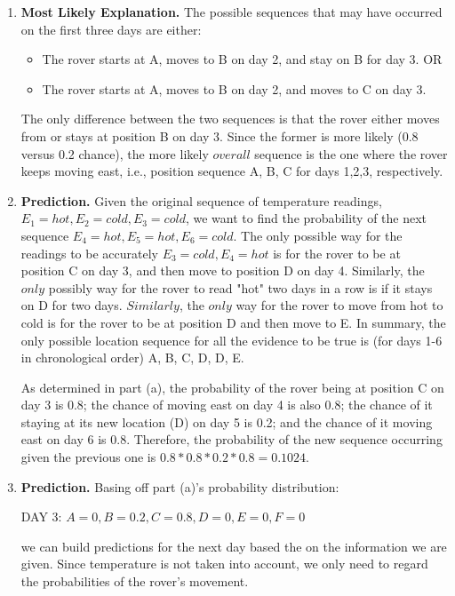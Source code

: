 \documentclass[12pt]{article}
\begin{document}
\begin{enumerate}[label=(\alph*)]
    \item \textbf{Most Likely Explanation.} The possible sequences that may have occurred on the first three days are either:
        \begin{itemize}
            \item The rover starts at A, moves to B on day 2, and stay on B for day 3. OR
            \item The rover starts at A, moves to B on day 2, and moves to C on day 3.
        \end{itemize}
    The only difference between the two sequences is that the rover either moves from or stays at position B on day 3. Since the former is more likely (0.8 versus 0.2 chance), the more likely $overall$ sequence is the one where the rover keeps moving east, i.e., position sequence A, B, C for days 1,2,3, respectively.
    
    \item \textbf{Prediction.} Given the original sequence of temperature readings, $E_1 = hot, E_2 = cold, E_3 = cold$, we want to find the probability of the next sequence $E_4 = hot, E_5 = hot, E_6 = cold$. The only possible way for the readings to be accurately $E_3 = cold, E_4 = hot$ is for the rover to be at position C on day 3, and then move to position D on day 4. Similarly, the $only$ possibly way for the rover to read "hot" two days in a row is if it stays on D for two days. $Similarly$, the $only$ way for the rover to move from hot to cold is for the rover to be at position D and then move to E. In summary, the only possible location sequence for all the evidence to be true is (for days 1-6 in chronological order) A, B, C, D, D, E.

    As determined in part (a), the probability of the rover being at position C on day 3 is 0.8; the chance of moving east on day 4 is also 0.8; the chance of it staying at its new location (D) on day 5 is 0.2; and the chance of it moving east on day 6 is 0.8. Therefore, the probability of the new sequence occurring given the previous one is $0.8 * 0.8 * 0.2 * 0.8 = 0.1024$.
    
    \item \textbf{Prediction.} Basing off part (a)'s probability distribution:
    \begin{center}
        DAY 3: $A = 0, B = 0.2, C = 0.8, D = 0, E = 0, F = 0$
    \end{center}
    we can build predictions for the next day based the on the information we are given. Since temperature is not taken into account, we only need to regard the probabilities of the rover's movement.


\end{enumerate}
\end{document}
